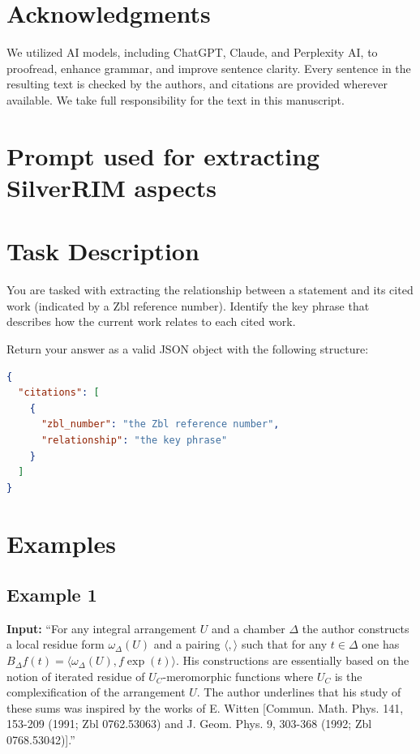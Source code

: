 \documentclass[sigconf,anonymous]{acmart}
\begin{document}
\section{Acknowledgments}

We utilized AI models, including ChatGPT, Claude, and Perplexity AI, to proofread, enhance grammar, and improve sentence clarity. 
Every sentence in the resulting text is checked by the authors, and citations are provided wherever available. 
We take full responsibility for the text in this manuscript.




\appendix

\section{Prompt used for extracting SilverRIM aspects}\label{Appendix:prompt}

\section*{Task Description}
You are tasked with extracting the relationship between a statement and its cited work (indicated by a Zbl reference number). Identify the key phrase that describes how the current work relates to each cited work.

Return your answer as a valid JSON object with the following structure:

\begin{lstlisting}[language=json]
{
  "citations": [
    {
      "zbl_number": "the Zbl reference number",
      "relationship": "the key phrase"
    }
  ]
}
\end{lstlisting}

\section*{Examples}

\subsection*{Example 1}

\textbf{Input:} ``For any integral arrangement $U$ and a chamber $\Delta$ the author constructs a local residue form $\omega_\Delta(U)$ and a pairing $\langle,\rangle$ such that for any $t\in\Delta$ one has $B_\Delta f(t)=\langle\omega_\Delta(U),f\exp(t)\rangle$. His constructions are essentially based on the notion of iterated residue of $U_C$-meromorphic functions where $U_C$ is the complexification of the arrangement $U$. The author underlines that his study of these sums was inspired by the works of E. Witten [Commun. Math. Phys. 141, 153-209 (1991; Zbl 0762.53063) and J. Geom. Phys. 9, 303-368 (1992; Zbl 0768.53042)].''
\end{document}
